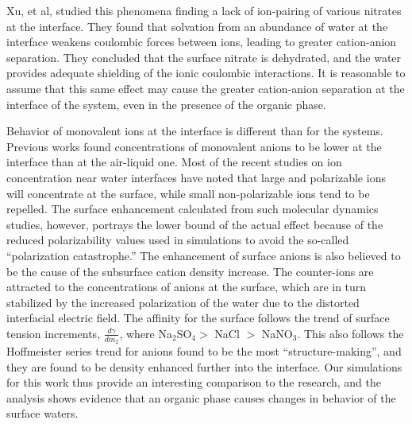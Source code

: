 Xu, et al, studied this phenomena finding a lack of ion-pairing of various nitrates at the \airwat interface.\cite{Xu2009} They found that solvation from an abundance of water at the interface weakens coulombic forces between ions, leading to greater cation-anion separation. They concluded that the surface nitrate is dehydrated, and the water provides adequate shielding of the ionic coulombic interactions. It is reasonable to assume that this same effect may cause the greater cation-anion separation at the interface of the \sodnit system, even in the presence of the organic phase.

Behavior of monovalent ions at the \ctcwat interface is different than for the \airwat systems. Previous works found concentrations of monovalent anions to be lower at the \ctcwat interface than at the air-liquid one.\cite{Wick2007a} Most of the recent studies on ion concentration near water interfaces have noted that large and polarizable ions will concentrate at the surface,\cite{Petersen2005b,Pegram2006,Sloutskin2007,Eggimann2008} while small non-polarizable ions tend to be repelled. The surface enhancement calculated from such molecular dynamics studies, however, portrays the lower bound of the actual effect because of the reduced polarizability values used in simulations to avoid the so-called ``polarization catastrophe.'' The enhancement of surface anions is also believed to be the cause of the subsurface cation density increase. The counter-ions are attracted to the concentrations of anions at the surface, which are in turn stabilized by the increased polarization of the water due to the distorted interfacial electric field. The affinity for the surface follows the trend of surface tension increments, $\frac{d\gamma}{dm_2}$, where Na$_2$SO$_4 >$ NaCl $>$ NaNO$_3$.\cite{Pegram2006} This also follows the Hoffmeister series trend for anions found to be the most ``structure-making'', and they are found to be density enhanced further into the interface. Our simulations for this work thus provide an interesting comparison to the \airwat research, and the analysis shows evidence that an organic phase causes changes in behavior of the surface waters.


